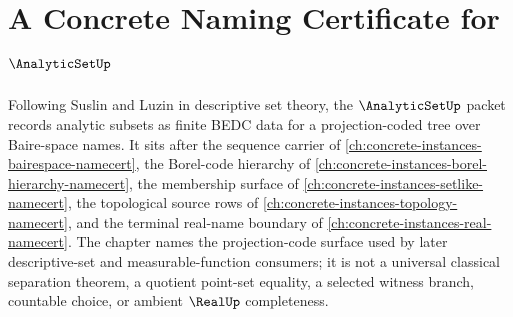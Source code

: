 \chapter{A Concrete Naming Certificate for $\AnalyticSetUp$}
\label{ch:concrete-instances-analytic-set-namecert}

Following Suslin and Luzin in descriptive set theory, the $\AnalyticSetUp$ packet records analytic subsets as finite BEDC data for a projection-coded tree over Baire-space names. It sits after the sequence carrier of \autoref{ch:concrete-instances-bairespace-namecert}, the Borel-code hierarchy of \autoref{ch:concrete-instances-borel-hierarchy-namecert}, the membership surface of \autoref{ch:concrete-instances-setlike-namecert}, the topological source rows of \autoref{ch:concrete-instances-topology-namecert}, and the terminal real-name boundary of \autoref{ch:concrete-instances-real-namecert}. The chapter names the projection-code surface used by later descriptive-set and measurable-function consumers; it is not a universal classical separation theorem, a quotient point-set equality, a selected witness branch, countable choice, or ambient $\RealUp$ completeness.

